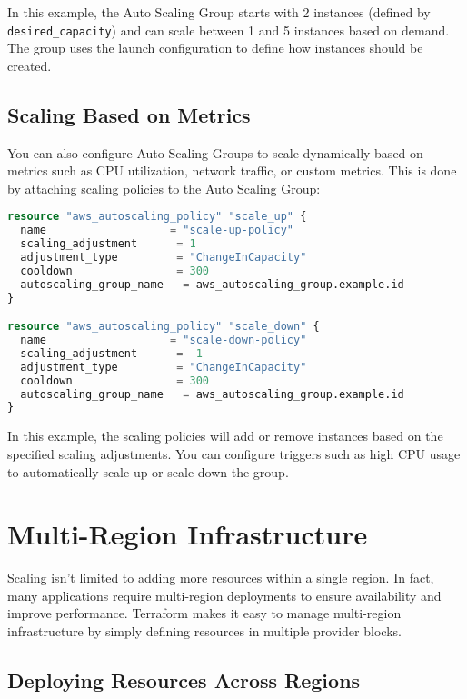 In this example, the Auto Scaling Group starts with 2 instances (defined by \texttt{desired\_capacity}) and can scale between 1 and 5 instances based on demand. The group uses the launch configuration to define how instances should be created.

\subsection{Scaling Based on Metrics}

You can also configure Auto Scaling Groups to scale dynamically based on metrics such as CPU utilization, network traffic, or custom metrics. This is done by attaching scaling policies to the Auto Scaling Group:

\begin{lstlisting}[language=terraform]
resource "aws_autoscaling_policy" "scale_up" {
  name                   = "scale-up-policy"
  scaling_adjustment      = 1
  adjustment_type         = "ChangeInCapacity"
  cooldown                = 300
  autoscaling_group_name   = aws_autoscaling_group.example.id
}

resource "aws_autoscaling_policy" "scale_down" {
  name                   = "scale-down-policy"
  scaling_adjustment      = -1
  adjustment_type         = "ChangeInCapacity"
  cooldown                = 300
  autoscaling_group_name   = aws_autoscaling_group.example.id
}
\end{lstlisting}

In this example, the scaling policies will add or remove instances based on the specified scaling adjustments. You can configure triggers such as high CPU usage to automatically scale up or scale down the group.

\section{Multi-Region Infrastructure}

Scaling isn't limited to adding more resources within a single region. In fact, many applications require multi-region deployments to ensure availability and improve performance. Terraform makes it easy to manage multi-region infrastructure by simply defining resources in multiple provider blocks.

\subsection{Deploying Resources Across Regions}

